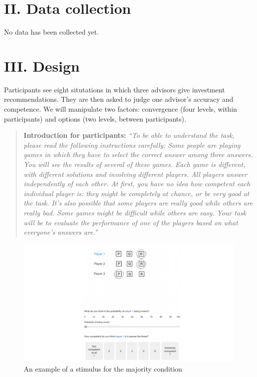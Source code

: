 \documentclass[
]{article}
\begin{document}
\hypertarget{ii.-data-collection}{%
\section{II. Data collection}\label{ii.-data-collection}}

No data has been collected yet.

\hypertarget{iii.-design}{%
\section{III. Design}\label{iii.-design}}

Participants see eight situtations in which three advisors give
investment recommendations. They are then asked to judge one advisor's
accuracy and competence. We will manipulate two factors: convergence
(four levels, within participants) and options (two levels, between
participants).

\begin{quote}
\textbf{Introduction for participants:} \emph{``To be able to understand
the task, please read the following instructions carefully: Some people
are playing games in which they have to select the correct answer among
three answers. You will see the results of several of these games. Each
game is different, with different solutions and involving different
players. All players answer independently of each other. At first, you
have no idea how competent each individual player is: they might be
completely at chance, or be very good at the task. It's also possible
that some players are really good while others are really bad. Some
games might be difficult while others are easy. Your task will be to
evaluate the performance of one of the players based on what everyone's
answers are.''}
\end{quote}

\begin{figure}
\centering
\includegraphics{figures/example_stimulus.png}
\caption{An example of a stimulus for the majority condition}
\end{figure}
\end{document}
